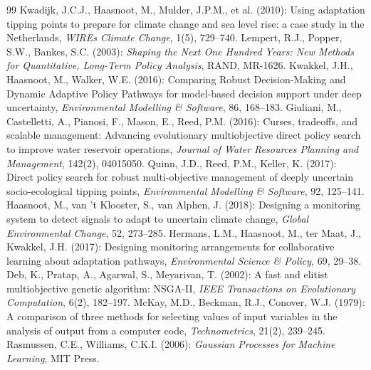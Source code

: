 \documentclass[a4paper,10pt]{ltjsarticle}
\begin{document}
\begin{thebibliography}{99}
 Kwadijk, J.C.J., Haasnoot, M., Mulder, J.P.M., et al. (2010): Using adaptation tipping points to prepare for climate change and sea level rise: a case study in the Netherlands, \textit{WIREs Climate Change}, 1(5), 729--740.
 Lempert, R.J., Popper, S.W., Bankes, S.C. (2003): \textit{Shaping the Next One Hundred Years: New Methods for Quantitative, Long-Term Policy Analysis}, RAND, MR-1626.
 Kwakkel, J.H., Haasnoot, M., Walker, W.E. (2016): Comparing Robust Decision-Making and Dynamic Adaptive Policy Pathways for model-based decision support under deep uncertainty, \textit{Environmental Modelling \& Software}, 86, 168--183.
 Giuliani, M., Castelletti, A., Pianosi, F., Mason, E., Reed, P.M. (2016): Curses, tradeoffs, and scalable management: Advancing evolutionary multiobjective direct policy search to improve water reservoir operations, \textit{Journal of Water Resources Planning and Management}, 142(2), 04015050.
 Quinn, J.D., Reed, P.M., Keller, K. (2017): Direct policy search for robust multi-objective management of deeply uncertain socio-ecological tipping points, \textit{Environmental Modelling \& Software}, 92, 125--141.
 Haasnoot, M., van 't Klooster, S., van Alphen, J. (2018): Designing a monitoring system to detect signals to adapt to uncertain climate change, \textit{Global Environmental Change}, 52, 273--285.
 Hermans, L.M., Haasnoot, M., ter Maat, J., Kwakkel, J.H. (2017): Designing monitoring arrangements for collaborative learning about adaptation pathways, \textit{Environmental Science \& Policy}, 69, 29--38.
 Deb, K., Pratap, A., Agarwal, S., Meyarivan, T. (2002): A fast and elitist multiobjective genetic algorithm: NSGA-II, \textit{IEEE Transactions on Evolutionary Computation}, 6(2), 182--197.
 McKay, M.D., Beckman, R.J., Conover, W.J. (1979): A comparison of three methods for selecting values of input variables in the analysis of output from a computer code, \textit{Technometrics}, 21(2), 239--245.
 Rasmussen, C.E., Williams, C.K.I. (2006): \textit{Gaussian Processes for Machine Learning}, MIT Press.
\end{thebibliography}
\end{document}
